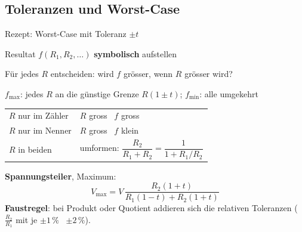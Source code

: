 \subsection{Toleranzen und Worst-Case}\label{sec:worstcase}

\begin{rezept}{Rezept: Worst-Case mit Toleranz $\pm t$}
	\begin{steps}
		\item Resultat $f(R_1, R_2, \dots)$ \textbf{symbolisch} aufstellen
		\item Für jedes $R$ entscheiden: wird $f$ grösser, wenn $R$ grösser wird?
		\item $f_{\max}$: jedes $R$ an die günstige Grenze $R(1\pm t)$; \; $f_{\min}$: alle umgekehrt
	\end{steps}
	\vspace{2pt}
	{\renewcommand{\arraystretch}{1.4}
	\begin{tabularx}{\linewidth}{@{}l X@{}}
		$R$ nur im Zähler  & $R$ gross \textrightarrow\ $f$ gross \\
		$R$ nur im Nenner  & $R$ gross \textrightarrow\ $f$ klein \\
		$R$ in beiden      & umformen: \; $\dfrac{R_2}{R_1+R_2} = \dfrac{1}{1+R_1/R_2}$
	\end{tabularx}}
\end{rezept}

\textbf{Spannungsteiler}, Maximum:
$$ V_{\max} = V\, \frac{R_2(1+t)}{R_1(1-t) + R_2(1+t)} $$
\textbf{Faustregel}: bei Produkt oder Quotient addieren sich die relativen Toleranzen ($\frac{R_2}{R_1}$ mit je $\pm1\,\%$ \textrightarrow\ $\pm 2\,\%$).

